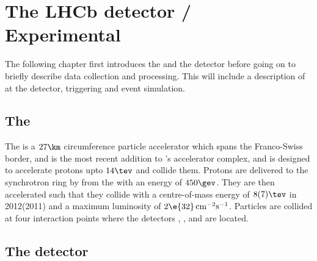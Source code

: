 \chapter{The LHCb detector / Experimental}
\label{ch:lhcb}

The following chapter first introduces the \lhc and the \lhcb detector before going on to briefly
describe data collection and processing.
This will include a description of \pid at the \lhcb detector, triggering and event simulation.



\section{The \lhc}
The \lhc is a $27\km$ circumference particle accelerator which spans the Franco-Swiss border, and
is the most recent addition to \cern's accelerator complex, and is designed to accelerate protons
upto $14\tev$ and collide them.
Protons are delivered to the \lhc synchrotron ring by from the \sps with an energy of $450\gev$.
They are then accelerated such that they collide with a centre-of-mass energy of $8(7)\tev$ in
2012(2011) and a maximum luminosity of $2\e{32}\,\mathrm{cm}^{-2}\mathrm{s}^{-1}$.
Particles are collided at four interaction points where the detectors \atlas, \alice, \cms and
\lhcb are located.










\section{The \lhcb detector}

